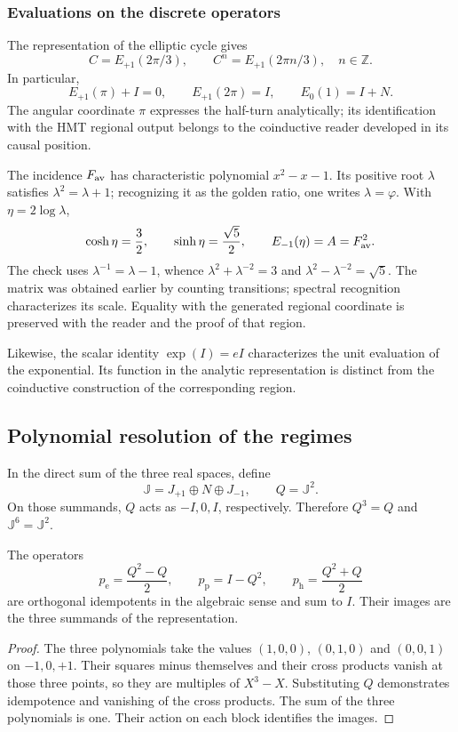 \subsubsection{Evaluations on the discrete operators}

The representation of the elliptic cycle gives
\[
 C=E_{+1}(2\pi/3),\qquad
 C^n=E_{+1}(2\pi n/3),\quad n\in\mathbb Z.
\]
In particular,
\[
 E_{+1}(\pi)+I=0,\qquad E_{+1}(2\pi)=I,
 \qquad E_0(1)=I+N.
\]
The angular coordinate \(\pi\) expresses the half-turn analytically;
its identification with the HMT regional output belongs to the coinductive
reader developed in its causal position.

The incidence \(F_{\rm av}\) has characteristic polynomial
\(x^2-x-1\). Its positive root \(\lambda\) satisfies
\(\lambda^2=\lambda+1\); recognizing it as the golden ratio, one writes
\(\lambda=\varphi\). With \(\eta=2\log\lambda\),
\[
 \cosh\eta=\frac32,\qquad \sinh\eta=\frac{\sqrt5}{2},
 \qquad E_{-1}(\eta)=A=F_{\rm av}^2.
\]
The check uses \(\lambda^{-1}=\lambda-1\), whence
\(\lambda^2+\lambda^{-2}=3\) and
\(\lambda^2-\lambda^{-2}=\sqrt5\). The matrix was obtained earlier by
counting transitions; spectral recognition characterizes its
scale. Equality with the generated regional coordinate is preserved
with the reader and the proof of that region.

Likewise, the scalar identity \(\exp(I)=eI\) characterizes the unit
 evaluation of the exponential. Its function in the analytic representation
is distinct from the coinductive construction of the corresponding region.

\subsection{Polynomial resolution of the regimes}
\label{eul:proyectores}

In the direct sum of the three real spaces, define
\[
 \mathbb J=J_{+1}\oplus N\oplus J_{-1},\qquad Q=\mathbb J^2.
\]
On those summands, \(Q\) acts as \(-I,0,I\), respectively.
Therefore \(Q^3=Q\) and \(\mathbb J^6=\mathbb J^2\).

\begin{proposicion}
\label{eul:prop:proyectores}
The operators
\[
 p_{\mathrm e}=\frac{Q^2-Q}{2},\qquad
 p_{\mathrm p}=I-Q^2,\qquad
 p_{\mathrm h}=\frac{Q^2+Q}{2}
\]
are orthogonal idempotents in the algebraic sense and sum to \(I\).
Their images are the three summands of the representation.
\end{proposicion}
\begin{proof}
The three polynomials take the values \((1,0,0)\), \((0,1,0)\) and
\((0,0,1)\) on \(-1,0,+1\). Their squares minus themselves and
their cross products vanish at those three points, so they are
multiples of \(X^3-X\). Substituting \(Q\) demonstrates idempotence and
vanishing of the cross products. The sum of the three polynomials
is one. Their action on each block identifies the images.
\end{proof}

